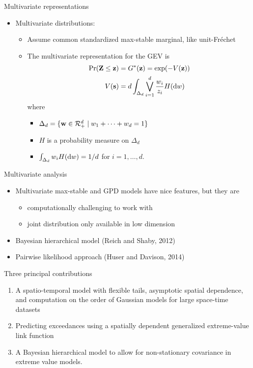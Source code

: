 \documentclass{beamer}
\begin{document}
\begin{frame}{Multivariate representations}
  \begin{itemize}
    \item Multivariate distributions:
    \begin{itemize}
      \item Assume common standardized max-stable marginal, like unit-Fr\'{e}chet

      \item The multivariate representation for the GEV is
      \begin{align*}
        \Pr(\mbox{\bf Z} \le \mbox{\bf z})  &= G^*(\mbox{\bf z}) = \exp(-V(\mbox{\bf z}))\\
                V(\mbox{\bf s})    &= d \int_{\Delta_d} \bigvee_{i = 1}^d \frac{w_i}{z_i} H(\text{d} w)
      \end{align*}
      where
      \begin{itemize}
        \item $\Delta_d = \{ \mbox{\bf w} \in {\cal R}^d_+ \mid w_1 + \cdots + w_d = 1\}$
        \item $H$ is a probability measure on $\Delta_d$
        \item $\int_{\Delta_d}w_i H(\text{d} w) = 1 / d$ for $i = 1, \ldots, d$.
      \end{itemize}
    \end{itemize}
  \end{itemize}
\end{frame}

\begin{frame}{Multivariate analysis}
  \begin{itemize} \setlength{\itemsep}{0.5em}
    \item Multivariate max-stable and GPD models have nice features, but they are
    \begin{itemize}
      \item computationally challenging to work with
      \item joint distribution only available in low dimension
    \end{itemize}
    \item Bayesian hierarchical model (Reich and Shaby, 2012)
    \item Pairwise likelihood approach (Huser and Davison, 2014)
  \end{itemize}
\end{frame}

\begin{frame}{Three principal contributions}
  \begin{enumerate}[1] \setlength{\itemsep}{0.5em}
    \item A spatio-temporal model with flexible tails, asymptotic spatial dependence, and computation on the order of Gaussian models for large space-time datasets
    \item Predicting exceedances using a spatially dependent generalized extreme-value link function
    \item A Bayesian hierarchical model to allow for non-stationary covariance in extreme value models.
  \end{enumerate}
\end{frame}
\end{document}
